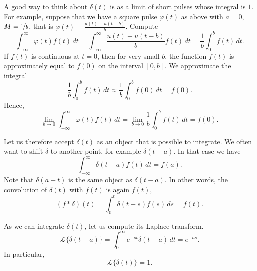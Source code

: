 \documentclass{ximera}
\begin{document}
A good way to think about $\delta(t)$ is as a limit of short pulses whose integral is $1$.  For example, suppose that we have a square pulse $\varphi(t)$ as above with $a=0$, $M=\nicefrac{1}{b}$, that is $\varphi(t) = \frac{u(t) - u(t-b)}{b}$. Compute
\begin{equation*}
    \int_{-\infty}^\infty \varphi(t) f(t) \,dt = \int_{-\infty}^\infty \frac{u(t) - u(t-b)}{b} f(t) \,dt = \frac{1}{b} \int_{0}^b f(t) \,dt .
\end{equation*}
If $f(t)$ is continuous at $t=0$, then for very small $b$, the function $f(t)$ is approximately equal to $f(0)$ on the interval $[0,b]$.  We approximate the integral
\begin{equation*}
    \frac{1}{b} \int_{0}^b f(t) \,dt \approx \frac{1}{b} \int_{0}^b f(0) \,dt = f(0) .
\end{equation*}
Hence,
\begin{equation*}
    \lim_{b\to 0} \int_{-\infty}^\infty \varphi(t) f(t) \,dt = \lim_{b\to 0} \frac{1}{b} \int_{0}^b f(t) \,dt  = f(0) .
\end{equation*}

Let us therefore accept $\delta(t)$ as an object that is possible to integrate.  We often want to shift $\delta$ to another point, for example $\delta(t-a)$.  In that case we have
\begin{equation*}
    \int_{-\infty}^\infty \delta(t-a) f(t) \,dt = f(a) .
\end{equation*}
Note that $\delta(a-t)$ is the same object as $\delta(t-a)$. In other words, the convolution of $\delta(t)$ with $f(t)$ is again $f(t)$,
\begin{equation*}
    (f * \delta) (t) = \int_{0}^t \delta(t-s) f(s) \,ds = f(t) .
\end{equation*}

As we can integrate $\delta(t)$, let us compute its Laplace transform.
\begin{equation*}
    {\mathcal{L}} \bigl\{ \delta(t-a) \bigr\} = \int_{0}^\infty e^{-st} \delta(t-a) \,dt = e^{-as} .
\end{equation*}
In particular,
\begin{equation*}
    {\mathcal{L}} \bigl\{ \delta(t) \bigr\} = 1 .
\end{equation*}
\end{document}
